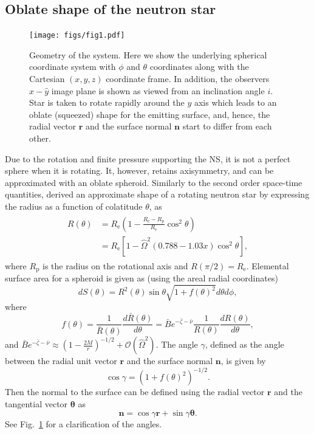 \documentclass{aa}
\newcommand{\be}{\begin{equation}}
\newcommand{\ee}{\end{equation}}
\renewcommand{\vec}[1]{\ensuremath{\boldsymbol{#1}}}
\newcommand{\Req}{\ensuremath{R_{\mathrm{e}}}}
\newcommand{\Ob}{\ensuremath{\hat{\Omega}}}
\newcommand{\nub}{\ensuremath{\bar{\nu}}}
\newcommand{\zetab}{\ensuremath{\bar{\zeta}}}
\newcommand{\Bb}{\ensuremath{\bar{B}}}
\begin{document}
\subsection{Oblate shape of the neutron star}\label{sect:oblate}

\begin{figure}
\centering
\texttt{[image: figs/fig1.pdf]}
\caption{\label{fig:geom}
Geometry of the system. Here we show the underlying spherical coordinate system with $\phi$ and $\theta$ coordinates along with the Cartesian $(x,y,z)$ coordinate frame.
In addition, the observers $\hat{x}-\hat{y}$ image plane is shown as viewed from an inclination angle $i$.
Star is taken to rotate rapidly around the $y$ axis which leads to an oblate (squeezed) shape for the emitting surface, and, hence, the radial vector $\vec{r}$ and the surface normal $\vec{n}$ start to differ from each other.
}
\end{figure}

Due to the rotation and finite pressure supporting the NS, it is not a perfect sphere when it is rotating.  
It, however, retains axisymmetry, and can be approximated with an oblate spheroid.  
Similarly to the second order space-time quantities, \citet{aGM14} derived an approximate shape of a rotating neutron star by expressing the radius as a function of colatitude $\theta$, as 
\begin{align}\begin{split}\label{eq:radf}
    R(\theta) &= \Req \left( 1 - \frac{\Req - R_{\mathrm{p}}}{\Req} \cos^2\theta \right) \\
              &= \Req [1-\Ob^2 (0.788 - 1.03x) \cos^2 \theta],
\end{split}\end{align}
where $R_{\mathrm{p}}$ is the radius on the rotational axis and $R(\pi/2) = \Req$.
Elemental surface area for a spheroid is given as (using the areal radial coordinates)
\be
dS(\theta) = R^2(\theta) \sin\theta \sqrt{1 + f(\theta)^2}d\theta d\phi,
\ee
where
\be
f(\theta) = \frac{1}{\bar{R}(\theta)} \frac{d \bar{R}(\theta)}{d \theta} 
= \Bb e^{-\zetab-\nub} \frac{1}{R(\theta)} \frac{dR(\theta)}{d\theta}, 
\ee
and $\Bb e^{-\zetab-\nub} \approx \left(1-\frac{2 M}{r}\right)^{-1/2} + \mathcal{O}(\Ob^2)$.
The angle $\gamma$, defined as the angle between the radial unit vector $\vec{r}$ and the surface normal $\vec{n}$, is given by
\be
\cos\gamma = \left(1 + f(\theta)^2\right)^{-1/2}.
\ee
Then the normal to the surface can be defined using the radial vector $\vec{r}$ and the tangential vector $\vec{\theta}$ as
\be\label{eq:surf_norm}
\vec{n} = \cos\gamma \vec{r} + \sin\gamma \vec{\theta}.
\ee
See Fig.~\ref{fig:geom} for a clarification of the angles.
\end{document}
